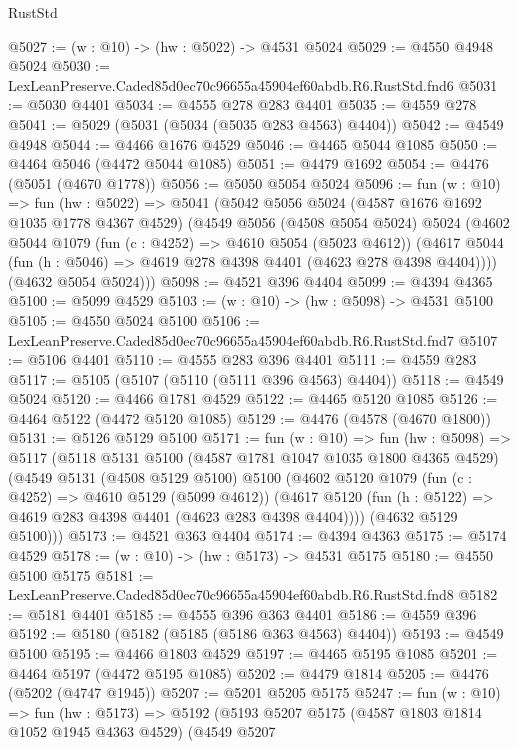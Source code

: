 \begin{lexlean}{RustStd}
\begin{coremodule}
@5027 := (w : @10) -> (hw : @5022) -> @4531 @5024
@5029 := @4550 @4948 @5024
@5030 := LexLeanPreserve.Caded85d0ec70c96655a45904ef60abdb.R6.RustStd.fnd6
@5031 := @5030 @4401
@5034 := @4555 @278 @283 @4401
@5035 := @4559 @278
@5041 := @5029 (@5031 (@5034 (@5035 @283 @4563) @4404))
@5042 := @4549 @4948
@5044 := @4466 @1676 @4529
@5046 := @4465 @5044 @1085
@5050 := @4464 @5046 (@4472 @5044 @1085)
@5051 := @4479 @1692
@5054 := @4476 (@5051 (@4670 @1778))
@5056 := @5050 @5054 @5024
@5096 := fun (w : @10) =>
  fun (hw : @5022) =>
  @5041
    (@5042
      @5056
      @5024
      (@4587 @1676 @1692 @1035 @1778 @4367 @4529)
      (@4549
        @5056
        (@4508 @5054 @5024)
        @5024
        (@4602
          @5044
          @1079
          (fun (c : @4252) => @4610 @5054 (@5023 @4612))
          (@4617 @5044 (fun (h : @5046) => @4619 @278 @4398 @4401 (@4623 @278 @4398 @4404))))
        (@4632 @5054 @5024)))
@5098 := @4521 @396 @4404
@5099 := @4394 @4365
@5100 := @5099 @4529
@5103 := (w : @10) -> (hw : @5098) -> @4531 @5100
@5105 := @4550 @5024 @5100
@5106 := LexLeanPreserve.Caded85d0ec70c96655a45904ef60abdb.R6.RustStd.fnd7
@5107 := @5106 @4401
@5110 := @4555 @283 @396 @4401
@5111 := @4559 @283
@5117 := @5105 (@5107 (@5110 (@5111 @396 @4563) @4404))
@5118 := @4549 @5024
@5120 := @4466 @1781 @4529
@5122 := @4465 @5120 @1085
@5126 := @4464 @5122 (@4472 @5120 @1085)
@5129 := @4476 (@4578 (@4670 @1800))
@5131 := @5126 @5129 @5100
@5171 := fun (w : @10) =>
  fun (hw : @5098) =>
  @5117
    (@5118
      @5131
      @5100
      (@4587 @1781 @1047 @1035 @1800 @4365 @4529)
      (@4549
        @5131
        (@4508 @5129 @5100)
        @5100
        (@4602
          @5120
          @1079
          (fun (c : @4252) => @4610 @5129 (@5099 @4612))
          (@4617 @5120 (fun (h : @5122) => @4619 @283 @4398 @4401 (@4623 @283 @4398 @4404))))
        (@4632 @5129 @5100)))
@5173 := @4521 @363 @4404
@5174 := @4394 @4363
@5175 := @5174 @4529
@5178 := (w : @10) -> (hw : @5173) -> @4531 @5175
@5180 := @4550 @5100 @5175
@5181 := LexLeanPreserve.Caded85d0ec70c96655a45904ef60abdb.R6.RustStd.fnd8
@5182 := @5181 @4401
@5185 := @4555 @396 @363 @4401
@5186 := @4559 @396
@5192 := @5180 (@5182 (@5185 (@5186 @363 @4563) @4404))
@5193 := @4549 @5100
@5195 := @4466 @1803 @4529
@5197 := @4465 @5195 @1085
@5201 := @4464 @5197 (@4472 @5195 @1085)
@5202 := @4479 @1814
@5205 := @4476 (@5202 (@4747 @1945))
@5207 := @5201 @5205 @5175
@5247 := fun (w : @10) =>
  fun (hw : @5173) =>
  @5192
    (@5193
      @5207
      @5175
      (@4587 @1803 @1814 @1052 @1945 @4363 @4529)
      (@4549
        @5207

\end{coremodule}
\end{lexlean}

